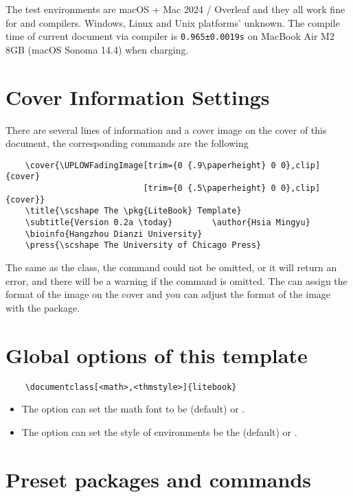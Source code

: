 The test environments are macOS + Mac 2024 / Overleaf and they all work fine for  and  compilers. Windows, Linux and Unix platforms' unknown. The compile time of current document via  compiler is \verb|0.965±0.0019s| on \textsf{MacBook Air M2 8GB (macOS Sonoma 14.4)} when charging.

\section{Cover Information Settings}

There are several lines of information and a cover image on the cover of this document, the corresponding commands are the following

\begin{verbatim}
    \cover{\UPLOWFadingImage[trim={0 {.9\paperheight} 0 0},clip]{cover}
                            [trim={0 {.5\paperheight} 0 0},clip]{cover}}
    \title{\scshape The \pkg{LiteBook} Template}
    \subtitle{Version 0.2a \today}        \author{Hsia Mingyu}
    \bioinfo{Hangzhou Dianzi University}
    \press{\scshape The University of Chicago Press}
\end{verbatim}

The same as the  class, the command  could not be omitted, or it will return an error, and there will be a warning if the command  is omitted. The  can assign the format of the image on the cover and you can adjust the format of the image with the  package.

\section{Global options of this template}

\begin{verbatim}
    \documentclass[<math>,<thmstyle>]{litebook}
\end{verbatim}

\begin{itemize}
    \item The  option can set the math font to be  (default) or .
    \item The  option can set the style of  environments be the  (default) or .
\end{itemize}

\section{Preset packages and commands}


